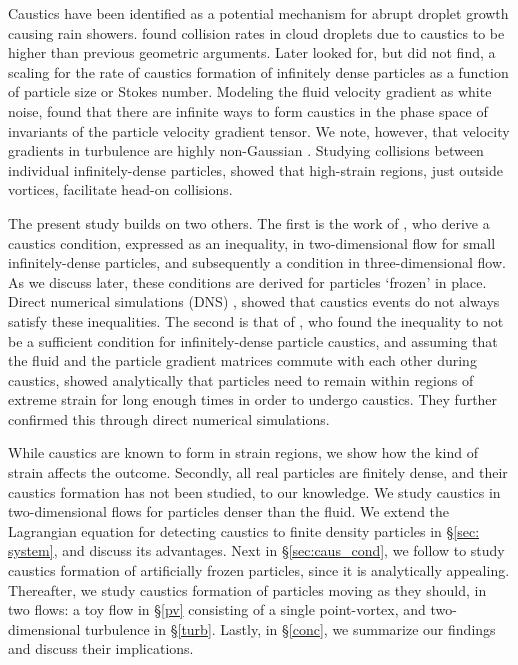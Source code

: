  Caustics have been identified \cite{falkovich2002,shaw2003,wilkinson2006} as a potential mechanism for abrupt droplet growth causing rain showers. \citet{falkovich2007} found collision rates in cloud droplets due to caustics to be higher than previous geometric arguments. Later \citet{bhatnagar2022} looked for, but did not find, a scaling for the rate of caustics formation of infinitely dense particles as a function of particle size or Stokes number. Modeling the fluid velocity gradient as white noise, \citet{barta2022} found that there are infinite ways to form caustics in the phase space of invariants of the particle velocity gradient tensor. We note, however, that velocity gradients in turbulence are highly non-Gaussian \cite{meneveau2011}. Studying collisions between individual infinitely-dense particles, \citet{picardo2019} showed that high-strain regions, just outside vortices, facilitate head-on collisions. 

The present study builds on two others. The first is the work of \citet{meibohm2021}, who derive a caustics condition, expressed as an inequality, in two-dimensional flow for small infinitely-dense particles, and subsequently \cite{meibohm2023} a condition in three-dimensional flow. As we discuss later, these conditions are derived for particles `frozen' in place. Direct numerical simulations (DNS) \cite{meibohm2024}, showed that caustics events do not always satisfy these inequalities. The second is that of \citet{batge2023}, who found the inequality to not be a sufficient condition for infinitely-dense particle caustics, and assuming that the fluid and the particle gradient matrices commute with each other during caustics, showed analytically that particles need to remain within regions of extreme strain for long enough times in order to undergo caustics. They further confirmed this through direct numerical simulations.

While caustics are known to form in strain regions, we show how {the kind of strain} affects the outcome. Secondly, all real particles are finitely dense, and their caustics formation has not been studied, to our knowledge. We {study caustics } in two-dimensional flows for particles denser than the fluid. We extend the Lagrangian equation for detecting caustics to finite density particles in \S \ref{sec: system}, and discuss its advantages. Next in \S \ref{sec:caus_cond}, we follow \cite{meibohm2021,meibohm2023} to study caustics formation of artificially frozen particles, since it is analytically appealing. Thereafter, we study caustics formation of particles moving as they should, in two flows: a toy flow in \S \ref{pv} consisting of a single point-vortex, and two-dimensional turbulence in \S \ref{turb}. Lastly, in \S \ref{conc}, we summarize our findings and discuss their implications.




